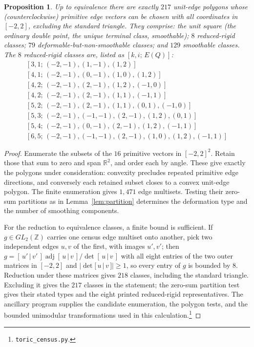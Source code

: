 \documentclass[11pt]{amsart}
\newtheorem{proposition}[theorem]{Proposition}
\theoremstyle{definition}
\theoremstyle{remark}
\newcommand{\ZZ}{\mathbb{Z}}
\newcommand{\RR}{\mathbb{R}}
\begin{document}
\begin{proposition}\label{prop:census}
Up to equivalence there are exactly $217$ unit-edge polygons whose
\textup(counterclockwise\textup) primitive edge vectors can be chosen with
all coordinates in $[-2,2]$, excluding the standard triangle.  They
comprise: the unit square (the ordinary double point, the unique terminal
class, smoothable); $8$ reduced-rigid classes; $79$ deformable-but-non-smoothable
classes; and $129$ smoothable classes.  The $8$ reduced-rigid classes are, listed as
$[k,i;\,E(Q)]$:
\[
\begin{array}{l}
[3,1;\,(-2,-1),(1,-1),(1,2)]\\[2pt]
[4,1;\,(-2,-1),(0,-1),(1,0),(1,2)]\\[2pt]
[4,2;\,(-2,-1),(2,-1),(1,2),(-1,0)]\\[2pt]
[4,2;\,(-2,-1),(2,-1),(1,1),(-1,1)]\\[2pt]
[5,2;\,(-2,-1),(2,-1),(1,1),(0,1),(-1,0)]\\[2pt]
[5,3;\,(-2,-1),(-1,-1),(2,-1),(1,2),(0,1)]\\[2pt]
[5,4;\,(-2,-1),(0,-1),(2,-1),(1,2),(-1,1)]\\[2pt]
[6,5;\,(-2,-1),(-1,-1),(2,-1),(1,0),(1,2),(-1,1)]
\end{array}
\]
\end{proposition}

\begin{proof}
Enumerate the subsets of the $16$ primitive vectors in $[-2,2]^2$.
Retain those that sum to zero and span $\RR^2$, and order each by angle.
These give exactly the polygons under consideration: convexity precludes
repeated primitive edge directions, and conversely each retained subset
closes to a convex unit-edge polygon.  The finite enumeration gives
$1{,}471$ edge multisets.  Testing their zero-sum partitions as in
Lemma~\ref{lem:partition} determines the deformation type and the number of
smoothing components.

For the reduction to equivalence classes, a finite bound is sufficient.  If
$g \in GL_2(\ZZ)$ carries one census edge multiset onto another, pick two
independent edges $u, v$ of the first, with images $u', v'$; then
$g = [\,u'\,|\,v'\,]\operatorname{adj}[\,u\,|\,v\,]/\det[\,u\,|\,v\,]$
with all eight entries of the two outer matrices in $[-2,2]$ and
$|\det[\,u\,|\,v\,]| \ge 1$, so every entry of $g$ is bounded by $8$.
Reduction under these matrices gives $218$ classes, including the standard
triangle.  Excluding it gives the $217$ classes in the statement; the
zero-sum partition test gives their stated types and the eight printed
reduced-rigid representatives.  The ancillary program supplies the candidate
enumeration, the polygon tests, and the bounded unimodular transformations
used in this calculation.\footnote{\texttt{toric\_census.py}.}
\end{proof}
\end{document}
